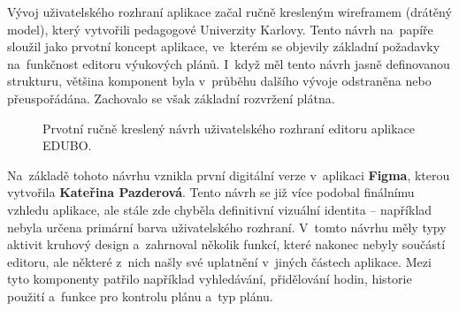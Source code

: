 \documentclass[male,czech,api_bc]{kitheses}
\begin{document}
Vývoj uživatelského rozhraní aplikace začal ručně kresleným wireframem (drátěný model), který vytvořili pedagogové Univerzity Karlovy. Tento návrh na~papíře sloužil jako prvotní koncept aplikace, ve~kterém se objevily základní požadavky na~funkčnost editoru výukových plánů. I~když měl tento návrh jasně definovanou strukturu, většina komponent byla v~průběhu dalšího vývoje odstraněna nebo přeuspořádána. Zachovalo se však základní rozvržení plátna.

\begin{figure}[H]
	\centering
	\caption{Prvotní ručně kreslený návrh uživatelského rozhraní editoru aplikace EDUBO.}
	\label{fig:edubo-navrh-1}
\end{figure}

Na~základě tohoto návrhu vznikla první digitální verze v~aplikaci \textbf{Figma}, kterou vytvořila \textbf{Kateřina Pazderová}. Tento návrh se již více podobal finálnímu vzhledu aplikace, ale stále zde chyběla definitivní vizuální identita – například nebyla určena primární barva uživatelského rozhraní. V~tomto návrhu měly typy aktivit kruhový design a~zahrnoval několik funkcí, které nakonec nebyly součástí editoru, ale některé z~nich našly své uplatnění v~jiných částech aplikace. Mezi tyto komponenty patřilo například vyhledávání, přidělování hodin, historie použití a~funkce pro kontrolu plánu a~typ plánu.
\end{document}
